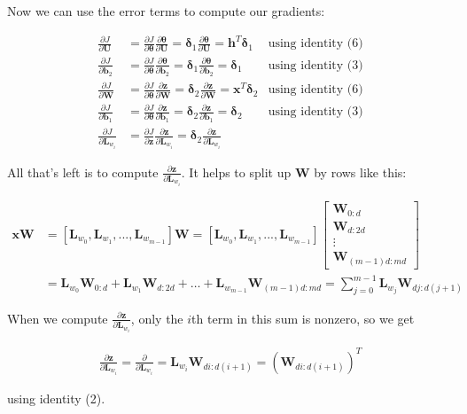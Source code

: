 \documentclass{article}[11pt]
\newcommand{\bW} { \bm{W} }
\newcommand{\bU} { \bm{U} }
\newcommand{\bb} { \bm{b} }
\newcommand{\bz} { \bm{z} }
\newcommand{\bx} { \bm{x} }
\newcommand{\btheta} { \bm{\theta} }
\newcommand{\bh} { \bm{h} }
\newcommand{\bL} { \bm{L} }
\newcommand{\bdelta} { \bm{\delta} }
\newcommand{\todo}[1] { \color{red}[TODO: #1]\color{black} }
\newcommand{\alns}[1] {
	\begin{align*} #1 \end{align*}
}
\newcommand{\pd}[2] {
 \frac{\partial #1}{\partial #2}
}
\begin{document}
 Now we can use the error terms to compute our gradients:
\alns{
	\pd{J}{\bU} &= \pd{J}{\btheta}\pd{\btheta}{\bU} = \bdelta_1\pd{\btheta}{\bU} = \bh^T \bdelta_1 & \text{using identity (6)} \\
	\pd{J}{\bb_2} &= \pd{J}{\btheta}\pd{\btheta}{\bb_2} = \bdelta_1\pd{\btheta}{\bb_2} =\bdelta_1 & \text{using identity (3)} \\
	\pd{J}{\bW} &= \pd{J}{\btheta}\pd{\bz}{\bW} = \bdelta_2\pd{\bz}{\bW} = \bx^T \bdelta_2 & \text{using identity (6)} \\
	\pd{J}{\bb_1} &= \pd{J}{\btheta}\pd{\bz}{\bb_1} = \bdelta_2\pd{\bz}{\bb_1} = \bdelta_2 & \text{using identity (3)} \\
	\pd{J}{\bL_{w_i}} &= \pd{J}{\bz}\pd{\bz}{\bL_{w_i}} = \bdelta_2 \pd{\bz}{\bL_{w_i}} 
}
All that's left is to compute $\pd{\bz}{\bL_{w_i}}$. It helps to split up $\bW$ by rows like this:
\alns{
	\bx \bW &= [\bL_{w_0}, \bL_{w_1}, ..., \bL_{w_{m - 1} }] \bW 
	= [\bL_{w_0}, \bL_{w_1}, ..., \bL_{w_{m - 1} }]  
	\begin{bmatrix} \bW_{0:d} \\ \bW_{d:2d} \\ \vdots \\ \bW_{(m - 1)d:md} \end{bmatrix} \\
	&= \bL_{w_0} \bW_{0:d}  + \bL_{w_1} \bW_{d:2d} + \dots + \bL_{w_{m - 1}}\bW_{(m - 1)d:md}
	=\sum_{j = 0}^{m - 1} \bL_{w_j} \bW_{dj:d(j + 1)}
}
When we compute $\pd{\bz}{\bL_{w_i}}$, only the $i$th term in this sum is nonzero, so we get
\alns{
	\pd{\bz}{\bL_{w_i}} = \pd{}{\bL_{w_i}} =  \bL_{w_i } \bW_{di:d(i + 1)} =  (\bW_{di:d(i + 1)})^T
}
using identity (2).
\end{document}
